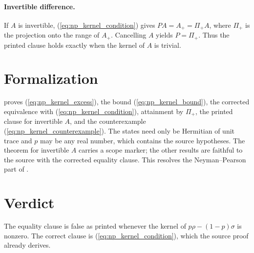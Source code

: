 \documentclass{article}
\begin{document}
\paragraph{Invertible difference.}
If $A$ is invertible, (\ref{eq:np_kernel_condition}) gives
$PA=A_+=\Pi_+A$, where $\Pi_+$ is the projection onto the range of $A_+$.
Cancelling $A$ yields $P=\Pi_+$. Thus the printed clause holds exactly when
the kernel of $A$ is trivial.

\section{Formalization}
 proves
(\ref{eq:np_kernel_excess}), the bound (\ref{eq:np_kernel_bound}), the
corrected equivalence with (\ref{eq:np_kernel_condition}), attainment by
$\Pi_+$, the printed clause for invertible $A$, and the counterexample
(\ref{eq:np_kernel_counterexample}). The states need only be Hermitian of
unit trace and $p$ may be any real number, which contains the source
hypotheses. The theorem for invertible $A$ carries a scope marker; the other
results are faithful to the source with the corrected equality clause. This
resolves the Neyman--Pearson part of .

\section{Verdict}
The equality clause is false as printed whenever the kernel of
$p\rho-(1-p)\sigma$ is nonzero. The correct clause is
(\ref{eq:np_kernel_condition}), which the source proof already derives.



\end{document}
